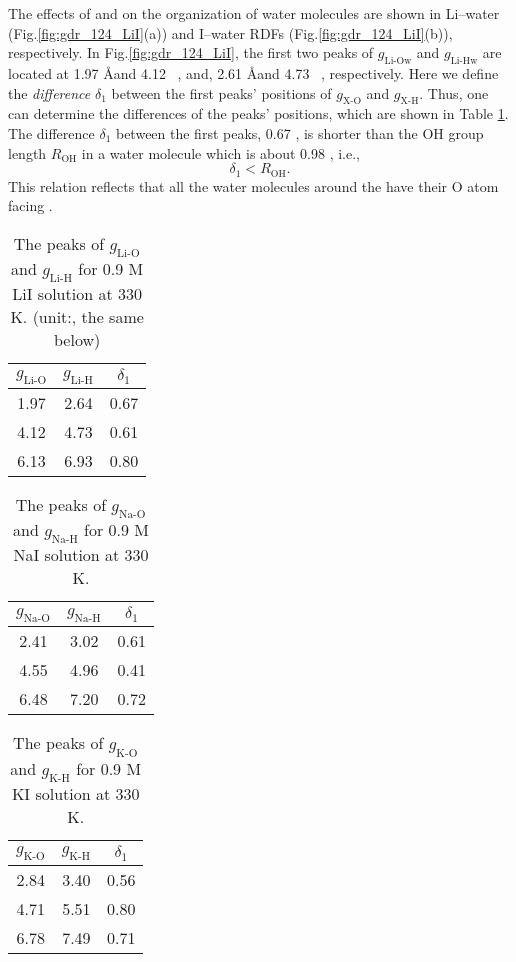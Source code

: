 The effects of \Li and \I on the organization of water molecules are shown in Li--water (Fig.\space\ref{fig:gdr_124_LiI}(a)) 
and I--water RDFs (Fig.\space\ref{fig:gdr_124_LiI}(b)), respectively.  
In Fig.\space\ref{fig:gdr_124_LiI}, the first two peaks of $g_{\text{Li-Ow}}$ and $g_{\text{Li-Hw}}$ are located at 1.97 \AA and 4.12 \ \A,  
and, 2.61 \AA and 4.73 \ \A, respectively. 
Here we define the \emph{difference} $\delta_1$ between the first peaks' positions of $g_{\text{X-O}}$ and $g_{\text{X-H}}$. 
Thus, one can determine the differences of the peaks' positions, which are shown in Table \ref{tab:gdr_Li-water}. 
The difference $\delta_1$ between the first peaks, 0.67 \A, is shorter than the OH group length $R_{\text{OH}}$ in a water molecule which is about 0.98 \A, i.e.,
\begin{equation}
\delta_1 < R_{\text{OH}}.
\label{lt_OH}
\end{equation}
This relation reflects that all the water molecules around the \Li have their O atom facing \li. 
\begin{table}[htbp]
\centering
\caption{\label{tab:gdr_Li-water} 
The peaks of $g_{\text{Li-O}}$ and $g_{\text{Li-H}}$ for 0.9 M LiI solution at 330 K. (unit:\A, the same below)}
\begin{tabular}{ccc}
  $g_{\text{Li-O}}$& $g_{\text{Li-H}}$ & $\delta_1$  \\
\hline
 1.97 & 2.64 & 0.67 \\
 4.12&4.73  &0.61  \\
 6.13 &6.93 & 0.80 
\end{tabular}
\end{table}
%
\begin{table}[htbp]
  \centering
  \caption{\label{tab:gdr_Na-water} 
  The peaks of $g_{\text{Na-O}}$ and $g_{\text{Na-H}}$ for 0.9 M NaI solution at 330 K.}
  \begin{tabular}{ccc}
    $g_{\text{Na-O}}$& $g_{\text{Na-H}}$ & $\delta_1$  \\
  \hline
   2.41 & 3.02 & 0.61 \\
   4.55 & 4.96  &0.41  \\
   6.48 & 7.20 & 0.72 
  \end{tabular}
\end{table}
%
\begin{table}[htbp]
    \centering
    \caption{\label{tab:gdr_K-water} 
    The peaks of $g_{\text{K-O}}$ and $g_{\text{K-H}}$ for 0.9 M KI solution at 330 K.}
    \begin{tabular}{ccc}
      $g_{\text{K-O}}$& $g_{\text{K-H}}$ & $\delta_1$  \\
    \hline
     2.84 & 3.40 & 0.56 \\
     4.71& 5.51  &0.80 \\
     6.78 & 7.49 & 0.71 
    \end{tabular}
\end{table}
